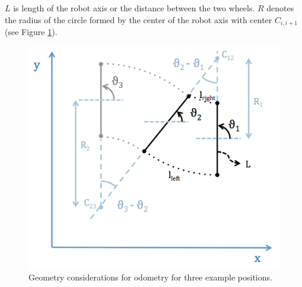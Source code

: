 $L$ is length of the robot axis or the distance between the two wheels. 
$R$ denotes the radius of the circle formed by the center of the robot axis with center $C_{i,i+1}$ (see Figure \ref{fig:odometry}).
\hspace{2em}

\begin{figure}[htb]
    \centering
    \includegraphics[width=0.7\linewidth]{files/Odometry.png}
    \caption{Geometry considerations for odometry for three example positions.}
    \label{fig:odometry}
\end{figure}
